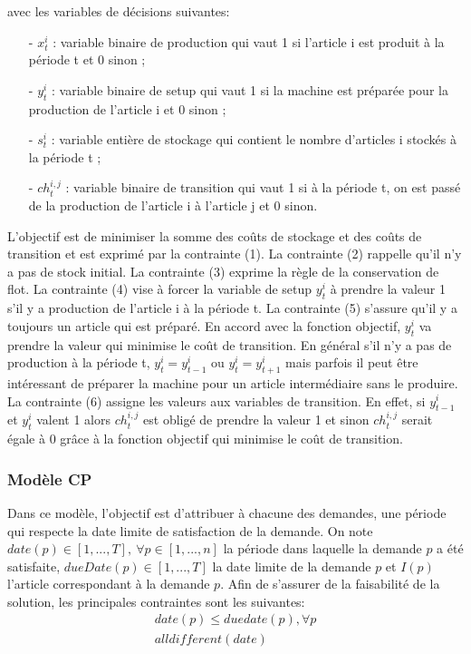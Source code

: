 \documentclass[12pt,a4paper]{article}
\begin{document}
		avec les variables de décisions suivantes: \\
		\begin{itemize}
			\item[-] $x_{t}^{i}$ : variable binaire de production qui vaut 1 si l’article i est produit à la période t et 0 sinon ;
			\item[-] $y_{t}^{i}$ : variable binaire de setup qui vaut 1 si la machine est préparée pour la production de l’article i et 0 sinon ;
			\item[-] $s_{t}^{i}$ : variable entière de stockage qui contient le nombre d’articles i stockés à la période t ; 
			\item[-] $ch_{t}^{i,j}$ : variable binaire de transition qui vaut 1 si à la période t, on est passé de la production de l’article i à l’article j et 0 sinon.
		\end{itemize}
		\vspace*{.3cm}
	\hspace*{.5cm} L'objectif est de minimiser la somme des coûts de stockage et des coûts de transition et est exprimé par la contrainte (1). La contrainte (2) rappelle qu'il n'y a pas de stock initial. La contrainte (3) exprime la règle de la conservation de flot. La contrainte (4) vise à forcer la variable de setup $y_{t}^{i}$ à prendre la valeur 1 s’il y a production de l’article i à la période t. La contrainte (5) s'assure qu'il y a toujours un article qui est préparé. En accord avec la fonction objectif, $y_{t}^{i}$ va prendre la valeur qui minimise le coût de transition. En général s’il n’y a pas de production à la période t,
$y_{t}^{i} = y_{t-1}^{i}$ ou $y_{t}^{i} = y_{t+1}^{i}$
mais parfois il peut être intéressant de préparer
la machine pour un article intermédiaire sans le produire. La contrainte (6) assigne les valeurs aux variables de transition.
En effet, si $y_{t-1}^{i}$ et $y_{t}^{i}$ valent 1 alors $ch_{t}^{i,j}$ est obligé de prendre la valeur 1 et sinon $ch_{t}^{i,j}$ serait égale à 0 grâce à la fonction objectif qui minimise le coût de transition.
		
		\subsubsection{Modèle CP}
		Dans ce modèle, l’objectif est d’attribuer à chacune des demandes, une période qui respecte la date limite de satisfaction de la demande. On note $date(p) \in [1,...,T],\ \forall p \in [1,...,n]$ la période dans laquelle la demande $p$ a été satisfaite, $dueDate(p) \in [1,...,T]$ la date limite de la demande $p$ et $I(p)$ l'article correspondant à la demande $p$. Afin de s'assurer de la faisabilité de la solution, les principales contraintes sont les suivantes:
		\begin{eqnarray}
			date(p) \leq duedate(p), \forall p \\
			alldifferent(date)
		\end{eqnarray}
		
\end{document}

